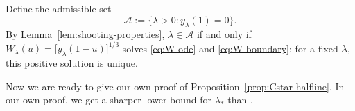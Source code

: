 \documentclass[12pt,preprint]{amsart}
\numberwithin{equation}{section}
\theoremstyle{plain}
\newtheorem{proposition}[theorem]{Proposition}
\theoremstyle{definition}
\newtheorem{remark}[theorem]{Remark}
\begin{document}
Define the admissible set
\[
 \mathcal A:=\{\lambda>0:y_\lambda(1)=0\}.
\]
By Lemma~\ref{lem:shooting-properties}, \(\lambda\in\mathcal A\) if and only if
$W_\lambda(u)=\bigl[y_\lambda(1-u)\bigr]^{1/3}$
solves \eqref{eq:W-ode} and \eqref{eq:W-boundary}; for a fixed \(\lambda\), this positive
solution is unique.

Now we are ready to give our own proof of Proposition~\ref{prop:Cstar-halfline}. In our own proof, we get a sharper lower bound for $\lambda_*$ than \cite{EnguicaGavioliSanchez2013}.
\end{document}
